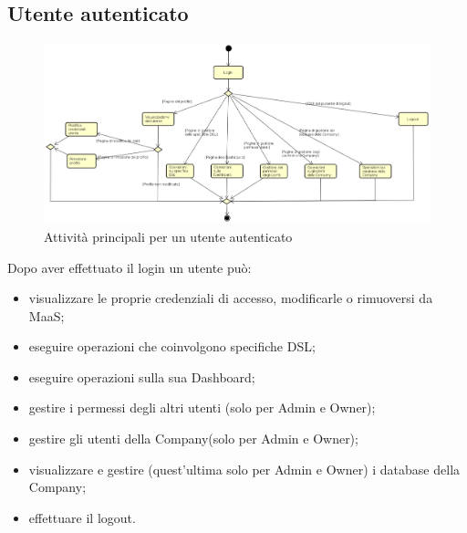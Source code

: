 \subsection{Utente autenticato}
\begin{figure}[H]
\begin{center}
\includegraphics[width=15cm]{res/sections/backend/activities/principaliConAuth.png}
\caption{Attività principali per un utente autenticato}
\end{center}
\end{figure}
Dopo aver effettuato il login un utente può:
\begin{itemize}
\item visualizzare le proprie credenziali di accesso, modificarle o rimuoversi da MaaS;
\item eseguire operazioni che coinvolgono specifiche DSL;
\item eseguire operazioni sulla sua Dashboard;
\item gestire i permessi degli altri utenti (solo per Admin e Owner);
\item gestire gli utenti della Company(solo per Admin e Owner);
\item visualizzare e gestire (quest'ultima solo per Admin e Owner) i database della Company;
\item effettuare il logout.
\end{itemize}
